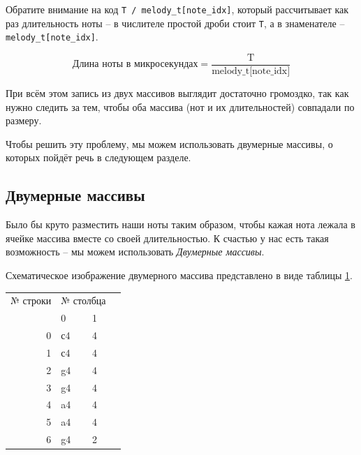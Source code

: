 \documentclass[a4paper,twoside]{book}
\newcounter{example-counter}
\begin{document}
Обратите внимание на код \texttt{T / melody\_t[note\_idx]}, который рассчитывает
как раз длительность ноты -- в числителе простой дроби стоит \texttt{T}, а в
знаменателе -- \texttt{melody\_t[note\_idx]}.

\begin{equation}
  \mbox{Длина ноты в микросекундах} = \frac{\mbox{T}}{\mbox{melody\_t[note\_idx]}}
\end{equation}

При всём этом запись из двух массивов выглядит достаточно громоздко, так как
нужно следить за тем, чтобы оба массива (нот и их длительностей) совпадали по
размеру.

Чтобы решить эту проблему, мы можем использовать двумерные массивы, о которых
пойдёт речь в следующем разделе.

\newpage
\subsection{Двумерные массивы}

Было бы круто разместить наши ноты таким образом, чтобы кажая нота лежала в
ячейке массива вместе со своей длительностью. К счастью у нас есть такая
возможность -- мы можем использовать \emph{Двумерные массивы}.

Схематическое изображение двумерного массива представлено в виде таблицы
\ref{table:array-example-2}.

\begin{table}[ht]
  \centering
  \begin{tabular}{r|l|l|l}
    \multicolumn{1}{l}{№ строки} & \multicolumn{2}{l}{№ столбца}                 &   \\
    \multicolumn{1}{l}{}         & \multicolumn{1}{l}{0} & \multicolumn{1}{l}{1} &   \\ 
    \cline{2-3}
    0                            & с4                    & 4                     &   \\ 
    \cline{2-3}
    1                            & с4                    & 4                     &   \\
    \cline{2-3}
    2                            & g4                    & 4                     &   \\
    \cline{2-3}
    3                            & g4                    & 4                     &   \\
    \cline{2-3}
    4                            & a4                    & 4                     &   \\
    \cline{2-3}
    5                            & a4                    & 4                     &   \\
    \cline{2-3}
    6                            & g4                    & 2                     &   \\
    \cline{2-3}
  \end{tabular}
  \label{table:array-example-2}
\end{table}
\end{document}
